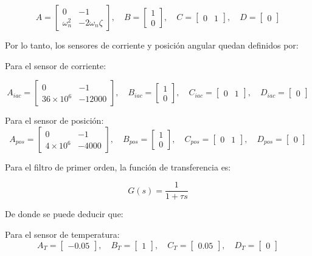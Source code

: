 \documentclass{article}
\begin{document}
\[
A = \begin{bmatrix}
0 & -1 \\
\omega_n^2 & -2\omega_n\zeta
\end{bmatrix}, \quad
B = \begin{bmatrix}
1 \\
0
\end{bmatrix}, \quad
C = \begin{bmatrix}
0 & 1
\end{bmatrix}, \quad
D = \begin{bmatrix}
0
\end{bmatrix}
\]

Por lo tanto, los sensores de corriente y posición angular quedan definidos por:

Para el sensor de corriente:

\[
A_{iac} = \begin{bmatrix}
0 & -1 \\
36 \times 10^6 & -12000
\end{bmatrix}, \quad
B_{iac} = \begin{bmatrix}
1 \\
0
\end{bmatrix}, \quad
C_{iac} = \begin{bmatrix}
0 & 1
\end{bmatrix}, \quad
D_{iac} = \begin{bmatrix}
0
\end{bmatrix}
\]

Para el sensor de posición:
\[
A_{pos} = \begin{bmatrix}
0 & -1 \\
4 \times 10^6 & -4000
\end{bmatrix}, \quad
B_{pos} = \begin{bmatrix}
1 \\
0
\end{bmatrix}, \quad
C_{pos} = \begin{bmatrix}
0 & 1
\end{bmatrix}, \quad
D_{pos} = \begin{bmatrix}
0
\end{bmatrix}
\]

Para el filtro de primer orden, la función de transferencia es:

\[
G(s) = \frac{1}{1 + \tau s}
\]

De donde se puede deducir que:

Para el sensor de temperatura:
\[
A_T = \begin{bmatrix}
-0.05
\end{bmatrix}, \quad
B_T = \begin{bmatrix}
1
\end{bmatrix}, \quad
C_T = \begin{bmatrix}
0.05
\end{bmatrix}, \quad
D_T = \begin{bmatrix}
0
\end{bmatrix}
\]
\end{document}
